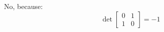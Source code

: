 \begin{sol}
    No, because:
    \begin{equation}
        \det \begin{bmatrix}
            0 & 1 \\ 1 & 0
        \end{bmatrix} = -1
    \end{equation}
\end{sol}